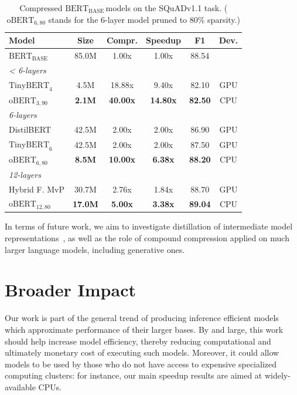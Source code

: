 \documentclass[11pt]{article}
\newcommand{\bert}{$\textrm{BERT}_{\textrm{BASE}}\,$}
\begin{document}
\begin{table}[h!]
\setlength{\tabcolsep}{4pt}
\vspace{-0.3in}
    \caption{Compressed \bert models on the SQuADv1.1 task. ($\textrm{oBERT}_{6,80}$ stands for the 6-layer model pruned to 80\% sparsity.)}
    \label{tab:other-methods}
    \centering
    {\small 
    \begin{tabular}{lccccc}
    \toprule 
    Model & Size & Compr. & Speedup & F1 & Dev. \\
    \midrule
    \bert & 85.0M & \phantom{1}1.00x & \phantom{1}1.00x & 88.54 &\\
    \midrule
    \multicolumn{5}{l}{\textit{< 6-layers}} \\
    $\textrm{TinyBERT}_4$ & \phantom{8}4.5M & 18.88x & \phantom{1}9.40x & 82.10 & GPU\\
    $\textrm{oBERT}_{3,90}$ & \phantom{8}\textbf{2.1M} & \textbf{40.00x} & \textbf{14.80x} & \textbf{82.50} & CPU\\
    \midrule
    \multicolumn{5}{l}{\textit{6-layers}} \\
    DistilBERT & 42.5M & \phantom{1}2.00x & 2.00x & 86.90 & GPU\\
    $\textrm{TinyBERT}_6$ & 42.5M & \phantom{1}2.00x & 2.00x & 87.50 & GPU\\
    $\textrm{oBERT}_{6,80}$ & \phantom{1}\textbf{8.5M} & \textbf{10.00x} & \textbf{6.38x} & \textbf{88.20} & CPU\\ 
    \midrule
    \multicolumn{5}{l}{\textit{12-layers}} \\
    Hybrid F. MvP & 30.7M & \phantom{1}2.76x & 1.84x & 88.70 & GPU\\
    $\textrm{oBERT}_{12,80}$ & \textbf{17.0M} & \phantom{1}\textbf{5.00x} & \textbf{3.38x} & \textbf{89.04} & CPU\\
    \bottomrule
    \end{tabular}
    }
    \vspace{-1em}
\end{table}

In terms of future work, we  aim to investigate distillation of intermediate model representations~\cite{Wang2020MiniLMDS}, as well as the role of compound compression applied on much larger language models, including generative ones. 

\section{Broader Impact}
Our work is part of the general trend of producing inference efficient models which approximate performance of their larger bases. By and large, this work should help increase model efficiency, thereby reducing computational and ultimately monetary cost of executing such models. Moreover, it could allow models to be used by those who do not have access to expensive specialized computing clusters: for instance, our main speedup results are aimed at widely-available CPUs. 
\end{document}
